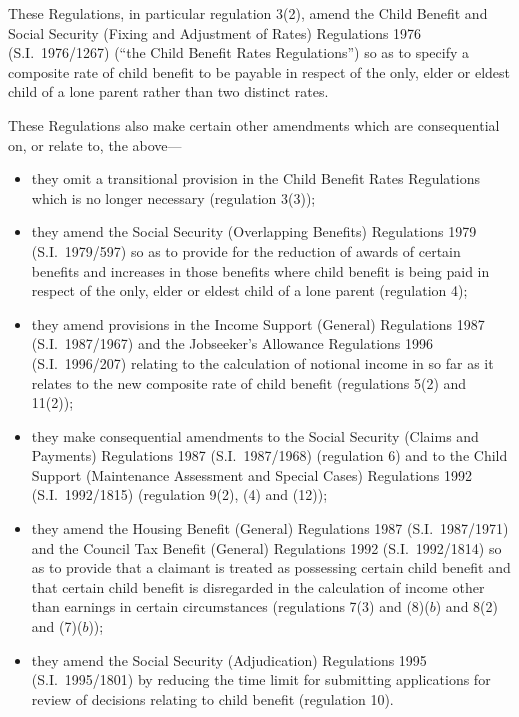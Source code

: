 \documentclass[a4paper]{article}
\begin{document}
These Regulations, in particular regulation 3(2), amend the Child Benefit and Social Security (Fixing and Adjustment of Rates) Regulations 1976 (S.I.\ 1976/1267) (“the Child Benefit Rates Regulations”) so as to specify a composite rate of child benefit to be payable in respect of the only, elder or eldest child of a lone parent rather than two distinct rates.

  These Regulations also make certain other amendments which are consequential on, or relate to, the above—
\begin{itemize}
\item they omit a transitional provision in the Child Benefit Rates Regulations which is no longer necessary (regulation 3(3));

\item they amend the Social Security (Overlapping Benefits) Regulations 1979 (S.I.\ 1979/597) so as to provide for the reduction of awards of certain benefits and increases in those benefits where child benefit is being paid in respect of the only, elder or eldest child of a lone parent (regulation 4);

\item they amend provisions in the Income Support (General) Regulations 1987 (S.I.\ 1987/1967) and the Jobseeker’s Allowance Regulations 1996 (S.I.\ 1996/207) relating to the calculation of notional income in so far as it relates to the new composite rate of child benefit (regulations 5(2) and 11(2));

\item they make consequential amendments to the Social Security (Claims and Payments) Regulations 1987 (S.I.\ 1987/1968) (regulation 6) and to the Child Support (Maintenance Assessment and Special Cases) Regulations 1992 (S.I.\ 1992/1815) (regulation 9(2), (4) and (12));

\item they amend the Housing Benefit (General) Regulations 1987 (S.I.\ 1987/\hspace{0pt}1971) and the Council Tax Benefit (General) Regulations 1992 (S.I.\ 1992/\hspace{0pt}1814) so as to provide that a claimant is treated as possessing certain child benefit and that certain child benefit is disregarded in the calculation of income other than earnings in certain circumstances (regulations 7(3) and (8)($b$) and 8(2) and (7)($b$));

\item they amend the Social Security (Adjudication) Regulations 1995 (S.I.\ 1995/1801) by reducing the time limit for submitting applications for review of decisions relating to child benefit (regulation 10).
\end{itemize}
\end{document}
